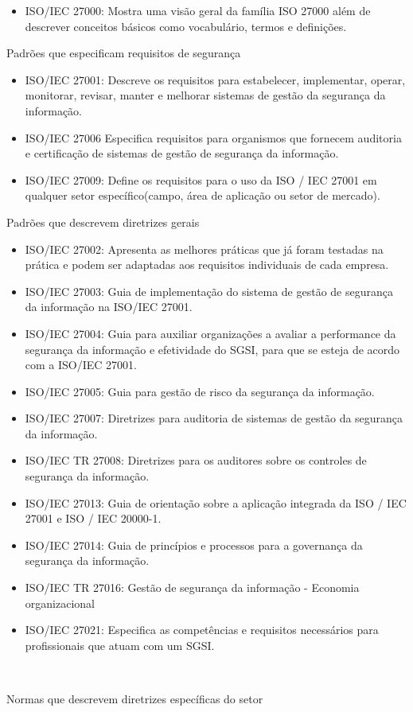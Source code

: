\begin{itemize}
    \item ISO/IEC 27000: Mostra uma visão geral da família ISO 27000 além de descrever conceitos básicos como vocabulário, termos e definições.
    \end{itemize}
    
    \item{Padrões que especificam requisitos de segurança}
    
    \begin{itemize}
    \item ISO/IEC 27001: Descreve os requisitos para estabelecer, implementar, operar, monitorar, revisar, manter e melhorar  sistemas de gestão da segurança da informação. 
    \item ISO/IEC 27006 Especifica requisitos para organismos que fornecem auditoria e certificação de sistemas de gestão de segurança da informação. 
    \item ISO/IEC 27009: Define os requisitos para o uso da ISO / IEC 27001 em qualquer setor específico(campo, área de aplicação ou setor de mercado).
    \end{itemize}
    
    \item{Padrões que descrevem diretrizes gerais}
    
    \begin{itemize}
    \item ISO/IEC 27002: Apresenta as melhores práticas que já foram testadas na prática e podem ser adaptadas aos requisitos individuais de cada empresa.
    \item ISO/IEC 27003: Guia de implementação do sistema de gestão de segurança da informação na ISO/IEC 27001.
    \item ISO/IEC 27004: Guia para auxiliar organizações a avaliar a performance da segurança da informação e efetividade do SGSI, para que se esteja de acordo com a  ISO/IEC 27001.
    \item ISO/IEC 27005: Guia para gestão de risco da segurança da informação.
    \item ISO/IEC 27007: Diretrizes para auditoria de sistemas de gestão da segurança da informação.
    \item ISO/IEC TR 27008: Diretrizes para os auditores sobre os controles de segurança da informação. 
    \item ISO/IEC 27013: Guia de orientação sobre a aplicação integrada da ISO / IEC 27001 e ISO / IEC 20000-1. 
    \item ISO/IEC 27014: Guia de princípios e processos para a governança da segurança da informação.
    \item ISO/IEC TR 27016: Gestão de segurança da informação - Economia organizacional
    \item ISO/IEC  27021: Especifica as competências e requisitos necessários para profissionais que atuam com um SGSI.
    \end{itemize}
   \
 \item{Normas que descrevem diretrizes específicas do setor}
 
